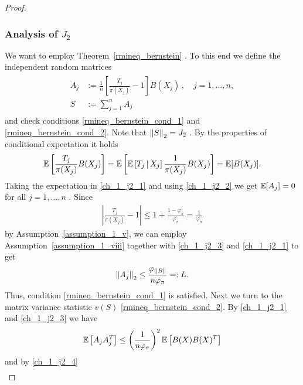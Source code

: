\begin{proof}
\subsubsection*{Analysis of $J_2$}
We want to employ 
Theorem~\ref{rmineq_bernstein}%
. %
To this end we define
the independent random matrices
\begin{align}
  \label{ch_1_j2_1}
  \begin{split}
  A_j
  &:=
      \frac{1}{n}
      \left[ 
        \frac{T_j}{\pi(X_j)}
      -
      1
      \right]
      B(X_j)
      \,,
      \quad 
      j=1,\ldots,n,
\\
  S
  &:=
  \sum_{j = 1}^{n} 
  A_j
  \end{split}
\end{align}
and check conditions 
\eqref{rmineq_bernstein_cond_1} 
and
\eqref{rmineq_bernstein_cond_2}.
Note that 
$
  \left\lVert S\right\rVert_2
  =
  J_2
$
.
By the properties of conditional expectation 
it holds
\begin{gather}
  \label{ch_1_j2_2}
  \mathbb{E}
  \left[  
    \frac{T_j}{\pi(X_j)}
    B(X_j)
  \right]
  =
  \mathbb{E}
  \left[  
    \mathbb{E}
    \left[  
      T_j
      \, | \,
      X_j
    \right]
    \frac{1}{\pi(X_j)}
    B(X_j)
  \right]
  =
  \mathbb{E}[B(X_j)]. 
\end{gather}
Taking the expectation in 
\eqref{ch_1_j2_1} 
and using
\eqref{ch_1_j2_2}
we get
$\mathbb{E}[A_j] = 0$
for all 
$
  j=1,\ldots,n
$
.
Since
\begin{gather}
  \label{ch_1_j2_3}
  \left| 
      \frac{T_j}{\pi(X_j)}
      -
      1
      \right|
  \le
  1 + \frac{1 - \varphi_{\pi}}{\varphi_{\pi}}
  =
  \frac{1}{\varphi_{\pi}}
\end{gather}
by Assumption~\ref{assumption_1_v},
we can employ Assumption~\ref{assumption_1_viii}
together with 
\eqref{ch_1_j2_3}
and
\eqref{ch_1_j2_1}
to get
\begin{gather}
  \label{ch_1_j2_4}
  \left\lVert A_j\right\rVert_2
  \le
  \frac{\varphi_{\left\lVert B\right\rVert}}{n \varphi_{\pi}}
  =:
  L.
\end{gather}
Thus,
condition \eqref{rmineq_bernstein_cond_1}
is satisfied.
Next we turn to the matrix variance statistic
$ v(S) $
\eqref{rmineq_bernstein_cond_2}.
By 
\eqref{ch_1_j2_1}
and
\eqref{ch_1_j2_3}
we have
\begin{gather}
  \label{ch_1_j2_5}
  \mathbb{E}
  \left[ 
    A_j A_j^T
  \right]
  \le
  \left( 
    \frac{1}{n \varphi_{\pi}}
  \right)^2
  \mathbb{E}
  \left[ 
    B(X) B(X)^T
  \right]
\end{gather}
and by \eqref{ch_1_j2_4} 
\begin{gather}

\end{gather}
\end{proof}
